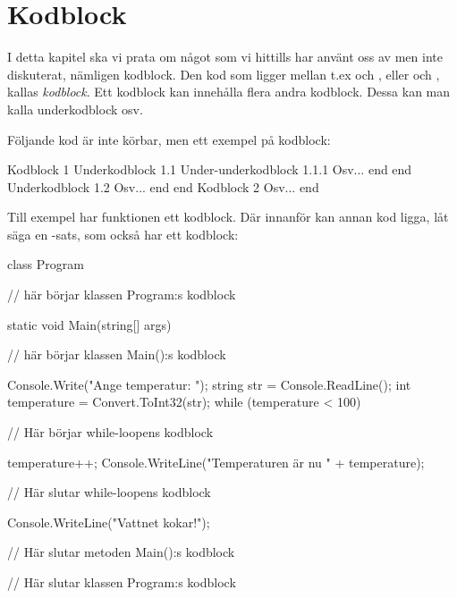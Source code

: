 %
%

\chapter{Kodblock}\label{ch:kodblock}
I detta kapitel ska vi prata om något som vi hittills har använt oss av men inte diskuterat, nämligen kodblock. Den kod som ligger mellan t.ex  och , eller  och , kallas \emph{kodblock}. Ett kodblock kan innehålla flera andra kodblock. Dessa kan man kalla underkodblock osv.

Följande kod är inte körbar, men ett exempel på kodblock:

\begin{csharp}[caption={Kodblock},label={}]
Kodblock 1
    Underkodblock 1.1
        Under-underkodblock 1.1.1
            Osv...
        end
    end
    Underkodblock 1.2
        Osv...
    end
end
Kodblock 2
    Osv...
end
\end{csharp}

Till exempel har funktionen  ett kodblock. Där innanför kan annan kod ligga, låt säga en -sats, som också har ett kodblock:

\begin{csharp}[caption={Kodblock med kommentarer},label={}]
class Program
{ // här börjar klassen Program:s kodblock

	static void Main(string[] args)
	{ // här börjar klassen Main():s kodblock

		Console.Write("Ange temperatur: ");
		string str = Console.ReadLine();
		int temperature = Convert.ToInt32(str);
		while (temperature < 100)
		{ // Här börjar while-loopens kodblock

			temperature++;
			Console.WriteLine("Temperaturen är nu " + temperature);

		} // Här slutar while-loopens kodblock

		Console.WriteLine("Vattnet kokar!");

	} // Här slutar metoden Main():s kodblock

} // Här slutar klassen Program:s kodblock

\end{csharp}


